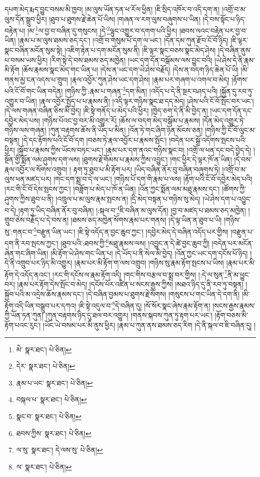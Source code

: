 དཔག་མེད་རྨད་བྱུང་བསམ་མི་ཁྱབ། །མ་ལུས་ཡོན་ཏན་ཕ་རོལ་ཕྱིན། །ཇི་སྲིད་འཁོར་བ་འདི་དག་ན། །འགྲོ་བ་མ་ལུས་དོན་སྒྲུབ་ཕྱིར། །ཐུབ་པ་ཐུགས་རྗེ་ཆེན་པོ་ཡིས། །གཞན་ལ་རག་ལུས་བཞུགས་པ་ཡིན། །དེ་བས་སྟོང་པ་ཉིད་བརྟེན་པ། །མ་\footnote{མེ་  སྣར་ཐང་།  པེ་ཅིན། }ལ་བྱ་བ་བཞིན་དུ་གསུངས། །དེ་\footnote{དེར་  སྣར་ཐང་།  པེ་ཅིན། }ལྷུང་འགྱུར་བ་དགག་པའི་ཕྱིར། །ཐབས་ལའང་བརྟེན་པར་བྱ་བ་ཡིན། །རྣམ་པ་མ་ལུས་ཐམས་ཅད་དང་། །འགྲོ་བ་གསུམ་པོ་དག་ལ་ཡང་། །དོན་དམ་ཀུན་རྫོབ་ངོ་བོ་ཉིད། །ཇི་ལྟར་སྣང་བཞིན་མངོན་སུམ་སྟེ། །འཇིག་རྟེན་པ་དག་མངོན་སུམ་ནི། །ཇི་ལྟར་སྣང་བཅས་སྣང་མེད་ཤེས། །དེ་བཞིན་ནུས་པ་བསམ་ཡས་ཕྱིར། །རིག་སྟེ་དེ་བས་ཐམས་ཅད་མཁྱེན། །ཡང་དག་དོན་བསྒོམས་ལས་བྱུང་བའི། །ཡེ་ཤེས་དེ་ནི་རྣམ་མི་རྟོག །ཆོས་རྣམས་སྣང་མེད་གང་ཡིན་པ། །དེས་ན་ཡང་དག་ཡེ་ཤེས་བརྗོད། །དེས་ན་བདག་ཉིད་ཆེན་པོ་ཡི། །མི་གནས་མྱ་ངན་འདས་པ་གྲུབ། །རྣལ་འབྱོར་ཀུན་ཤེས་ཡང་དག་ཤེས། །རྣམ་པར་གཞག་པ་འགལ་བ་མེད། །རྟོགས་པའི་ངོ་བོ་གང་ཡིན་བདེན། །གཉིས་ཀྱི་:རྣམ་པ་གཞན་\footnote{རྣམ་པ་ཡང་  སྣར་ཐང་།  པེ་ཅིན། }དག་མིན། །འདོད་པ་དེ་ནི་སྔར་བཤད་པའི། །སྐྱོན་དུ་རབ་ཏུ་འགྱུར་བ་ཡིན། །རྣལ་འབྱོར་སྤྱོད་པ་པ་རྣམས་ནི། །འདི་ལྟར་གཉིས་སྣང་ཐ་དད་མེད། །ཤེས་པའི་ངོ་བོ་སྤོང་བར་ཡང་། །དེ་ལས་གཞན་བཞིན་ཅིས་མི་བྱེད། །ཇི་སྟེ་གནོད་པ་མེད་པའི་ཕྱིར། །ཁྱེད་ཅག་དེ་ནི་མི་བྱེད་ན། །ཡང་དག་དོན་དང་དབྱེར་མེད་པས། །གཉིས་པོའང་བྱ་བར་མི་འགྱུར་རོ། །ཆོས་ལ་བདག་མེད་བསྒོམ་པ་རྣམས། །དོན་མེད་འགྱུར་ཏེ་གཉིས་ལས་གཞན། །ཀུན་བརྟགས་ཆོས་ནི་ཡོད་པ་མིན། །འོན་ཏེ་གང་ཞིག་ཉོན་མོངས་ཅན། །གཉིས་ཀྱི་ངོ་བོ་ལུང་མ་བསྟན། །དེ་དང་རྟོགས་པའི་ངོ་བོ་དག །བཅས་ཏེ་རྣལ་འབྱོར་པ་རྣམས་སྤོང་། །བདེན་པར་སྒྲོ་འདོགས་སྤངས་པའི་ཕྱིར། །སྐྱོབ་པ་རྣམས་ཀྱིས་ཡོངས་བཏང་ཡང་། །རྣམ་པར་དག་ནའང་གཉིས་སྣང་བ། །འགྲོ་ལ་ཕན་དང་བདེ་བྱེད་དེ། །སྔོན་གྱི་སྨོན་ལམ་ཤུགས་དག་ལས། །ཐུགས་རྗེ་གོམས་པ་རྣམས་ཀྱིས་འབྱུང་། །གང་ཕྱིར་དེ་ལྟར་ཁོ་ན་ཡིན། །དེ་བས་རྣལ་འབྱོར་ལ་སོགས་འགྲུབ། །
རྟག་ཏུ་ཐུབ་པ་མི་རྟོག་པར། །ཡིད་བཞིན་ནོར་བུ་བཞིན་བཞུགས་ཏེ། །འགྲོ་བ་མ་ལུས་ཕན་མཛད་པར། །གང་དག་སྨྲ་བ་དེ་ལ་ཡང་། །གཉིས་པོ་དག་གི་རྣམ་པ་ལས། །རྟོག་པའི་ངོ་བོ་དབྱེར་མེད་པའི། །རང་གི་ངོ་བོ་དེས་སྤངས་ཀྱང་། །བཟློག་པ་མེད་པ་ཁོ་ན་ཡིན། །འོན་ཀྱང་སྨོན་ལམ་མཐུ་རྣམས་དང་། །ཚོགས་ཀྱི་ཤུགས་ཀྱིས་ཐུབ་པ་ནི། །འཁྲུལ་པ་མ་ལུས་རྣམ་སྤངས་ན། །དྲི་མེད་བསྟན་པ་གཉིས་སུ་མེད། །ཡེ་ཤེས་དག་པ་འབྱུང་བ་དེ། །རྟག་ཏུ་ཡིད་བཞིན་ནོར་བུ་བཞིན། །:སྐལ་བ་\footnote{བསྐལ་པ་  སྣར་ཐང་།  པེ་ཅིན། }ཇི་བཞིན་མ་ལུས་དོན། །བྱ་བ་མཛད་པ་ཐམས་ཅད་མཁྱེན། །གྲུབ་ཅེས་བརྗོད་པ་དེ་བས་ན། །ཐམས་ཅད་མཁྱེན་སོགས་རྣམ་པར་གནས། །དེ་ལྟ་ཡིན་ན་ཐུབ་པ་ཡི། །གཉིས་སུ་:གནང་བ་\footnote{སྣང་བ་  སྣར་ཐང་།  པེ་ཅིན། }བརྫུན་ཡིན་ཡང་། །ཇི་སྟེ་འདོད་ན་བྱང་ཆུབ་ཀྱང་། །དབྱེར་མེད་དེ་བཞིན་འདོད་པར་གྱིས། །བརྫུན་པ་དག་ནི་རབ་སྤངས་ཀྱང་། །ཐུབ་པའི་:ཐབས་ཀྱི་\footnote{ཐབས་ཀྱིས་  སྣར་ཐང་།  པེ་ཅིན། }མཐུ་རྣམས་ལས། །འབྱུང་ན་དེ་ཚེ་བྱང་ཆུབ་ཀྱི། །བདེན་པར་མངོན་ཞེན་གང་ཞིག་ཡིན། །མི་རྟོག་ཡེ་ཤེས་གང་ཡིན་པ། །དེ་ཡོད་པ་ནི་སེལ་མི་བྱེད། །འོན་ཀྱང་ཡང་དག་དངོས་པོ་ཉིད། །དེ་ནི་འགྲུབ་པར་ཉིད་མི་འགྱུར། །རྣམ་པར་མི་རྟོག་ག་ལས་འགྲུབ། །གཉིས་སུ་རྣམ་རྟོག་སྤངས་པ་ཡིས། །རྣམ་པར་མི་རྟོག་དེ་འདོད་ནའང་། །རང་གི་དངོས་ལ་རྣམ་རྟོག་འདི། །གང་གིས་བརྩལ་བ་སྨྲ་བར་གྱིས། །:དེ་ལ་སུན་\footnote{ལ་སུ་  སྣར་ཐང་། དེ་ལས་སུ་  པེ་ཅིན། }ནི་མ་ཕྱུང་བར། །རྣམ་པར་རྟོག་དེས་སྤོང་བ་མེད། །དངོས་པོར་འཛིན་པ་སངས་རྒྱས་ཀྱིས། །མཐའ་ཉིད་དུ་ནི་རབ་ཏུ་བསྟན། །སྐྱོབ་པའི་མ་འདྲེས་ཆོས་རྣམས་དང་། །དེ་བཞིན་བྱམས་པ་ཐུགས་རྗེ་སོགས། །གསུངས་པ་གང་ཡིན་དེ་དག་ནི། །མི་རྟོག་འདི་ཡིན་བསྒྲུབ་པར་དཀའ། །ཇི་སྟེ་འདུལ་བ་\footnote{ལ་  སྣར་ཐང་།  པེ་ཅིན། }དེ་བཞིན་དུ། །སོ་སོར་སྣང་ཞེས་རྣམ་རྟོག་ན། །སངས་རྒྱས་རྣམས་ཀྱི་ཡོན་ཏན་ཀུན། །ཀུན་བརྟགས་ཉིད་དུ་ཐལ་བར་འགྱུར། །གནས་སྐབས་ཀུན་ཏུ་རྟག་པར་ཡང་། །རྟོག་བཅས་མི་རྟོག་པའང་རུང་། །ཡོང་ཡེ་བསམ་པར་མི་ནུས་ཕྱིར། །རྣམ་པ་ཀུན་ནས་ཐམས་ཅད་རིག །དེ་ནི་སྐལ་བ་ཇི་བཞིན་དུ། །
